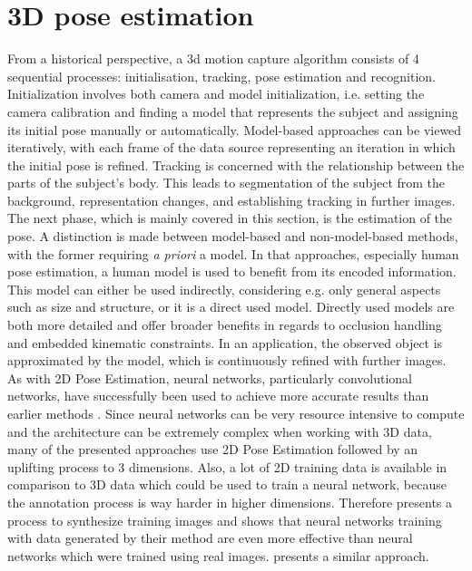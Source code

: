 \section{3D pose estimation}
From a historical perspective, a 3d motion capture algorithm consists of 4 sequential processes: initialisation, tracking, pose estimation and recognition. Initialization involves both camera and model initialization, i.e. setting the camera calibration and finding a model that represents the subject and assigning its initial pose manually or automatically. Model-based approaches can be viewed iteratively, with each frame of the data source representing an iteration in which the initial pose is refined. Tracking is concerned with the relationship between the parts of the subject's body. This leads to segmentation of the subject from the background, representation changes, and establishing tracking in further images. The next phase, which is mainly covered in this section, is the estimation of the pose. A distinction is made between model-based and non-model-based methods, with the former requiring  \emph{a priori} a model. In that approaches, especially human pose estimation, a human model is used to benefit from its encoded information. This model can either be used indirectly, considering e.g. only general aspects such as size and structure, or it is a direct used model. Directly used models are both more detailed and offer broader benefits in regards to occlusion handling and embedded kinematic constraints. In an application, the observed object is approximated by the model, which is continuously refined with further images.\cite{summary80s}
\\
As with 2D Pose Estimation, neural networks, particularly convolutional networks, have successfully been used to achieve more accurate results than earlier methods \cite{Chen2016, Chen_2017_CVPR, Tome_2017_CVPR, Andrikula2010, Ye2011, Martinez_2017_ICCV}. Since neural networks can be very resource intensive to compute and the architecture can be extremely complex when working with 3D data, many  of the presented approaches use 2D Pose Estimation followed by an uplifting process to 3 dimensions. Also, a lot of 2D training data is available in comparison to 3D data which could be used to train a neural network, because the annotation process is way harder in higher dimensions. Therefore \cite{Chen2016} presents a process to synthesize training images and shows that neural networks training with data generated by their method are even more effective than neural networks which were trained using real images. \cite{Rogez2016} presents a similar approach.

